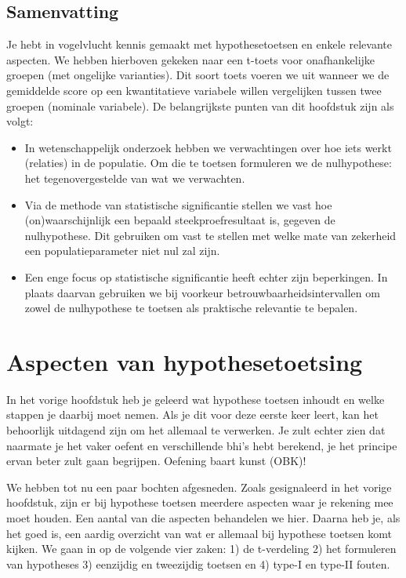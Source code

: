 \documentclass[
  letterpaper,
  DIV=11,
  numbers=noendperiod]{scrreprt}
\begin{document}
\section{Samenvatting}\label{samenvatting-3}

Je hebt in vogelvlucht kennis gemaakt met hypothesetoetsen en enkele
relevante aspecten. We hebben hierboven gekeken naar een t-toets voor
onafhankelijke groepen (met ongelijke varianties). Dit soort toets
voeren we uit wanneer we de gemiddelde score op een kwantitatieve
variabele willen vergelijken tussen twee groepen (nominale variabele).
De belangrijkste punten van dit hoofdstuk zijn als volgt:

\begin{itemize}
\item
  In wetenschappelijk onderzoek hebben we verwachtingen over hoe iets
  werkt (relaties) in de populatie. Om die te toetsen formuleren we de
  nulhypothese: het tegenovergestelde van wat we verwachten.
\item
  Via de methode van statistische significantie stellen we vast hoe
  (on)waarschijnlijk een bepaald steekproefresultaat is, gegeven de
  nulhypothese. Dit gebruiken om vast te stellen met welke mate van
  zekerheid een populatieparameter niet nul zal zijn.
\item
  Een enge focus op statistische significantie heeft echter zijn
  beperkingen. In plaats daarvan gebruiken we bij voorkeur
  betrouwbaarheidsintervallen om zowel de nulhypothese te toetsen als
  praktische relevantie te bepalen.
\end{itemize}

\chapter{Aspecten van
hypothesetoetsing}\label{aspecten-van-hypothesetoetsing}

In het vorige hoofdstuk heb je geleerd wat hypothese toetsen inhoudt en
welke stappen je daarbij moet nemen. Als je dit voor deze eerste keer
leert, kan het behoorlijk uitdagend zijn om het allemaal te verwerken.
Je zult echter zien dat naarmate je het vaker oefent en verschillende
bhi's hebt berekend, je het principe ervan beter zult gaan begrijpen.
Oefening baart kunst (OBK)!

We hebben tot nu een paar bochten afgesneden. Zoals gesignaleerd in het
vorige hoofdstuk, zijn er bij hypothese toetsen meerdere aspecten waar
je rekening mee moet houden. Een aantal van die aspecten behandelen we
hier. Daarna heb je, als het goed is, een aardig overzicht van wat er
allemaal bij hypothese toetsen komt kijken. We gaan in op de volgende
vier zaken: 1) de t-verdeling 2) het formuleren van hypotheses 3)
eenzijdig en tweezijdig toetsen en 4) type-I en type-II fouten.
\end{document}
